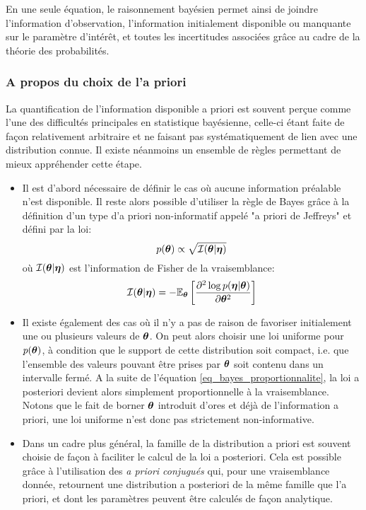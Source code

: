 	En une seule équation, le raisonnement bayésien permet ainsi de joindre l'information d'observation, l'information initialement disponible ou manquante sur le paramètre d'intérêt, et toutes les incertitudes associées grâce au cadre de la théorie des probabilités.
	
	\subsubsection{A propos du choix de l'a priori}
	
	La quantification de l'information disponible a priori est souvent perçue comme l'une des difficultés principales en statistique bayésienne, celle-ci étant faite de façon relativement arbitraire et ne faisant pas systématiquement de lien avec une distribution connue. Il existe néanmoins un ensemble de règles permettant de mieux appréhender cette étape.
	
	\begin{itemize}
		\item Il est d'abord nécessaire de définir le cas où aucune information préalable n'est disponible. Il reste alors possible d'utiliser la règle de Bayes grâce à la définition d'un type d'a priori non-informatif appelé "a priori de Jeffreys" et défini par la loi:\\
		\begin{equation}
		p({\bm{\theta}}) \propto \sqrt{\mathcal{I}({\bm{\theta}} | {\bm{\eta}})}
		\label{eq_jeffreys}
		\end{equation}
		où $\mathcal{I}({\bm{\theta}} | {\bm{\eta}})$ est l'information de Fisher de la vraisemblance:
		\begin{equation}
		\mathcal{I}({\bm{\theta}} | {\bm{\eta}}) = -\mathbb{E}_{\bm{\theta}}\left[\dfrac{\partial^2 \log p({\bm{\eta}}|{\bm{\theta}})}{\partial {\bm{\theta}}^2}\right]
		\end{equation}
		
		\item Il existe également des cas où il n'y a pas de raison de favoriser initialement une ou plusieurs valeurs de ${\bm{\theta}}$. On peut alors choisir une loi uniforme pour $p({\bm{\theta}})$, à condition que le support de cette distribution soit compact, i.e. que l'ensemble des valeurs pouvant être prises par ${\bm{\theta}}$ soit contenu dans un intervalle fermé. A la suite de l'équation \eqref{eq_bayes_proportionnalite}, la loi a posteriori devient alors simplement proportionnelle à la vraisemblance. Notons que le fait de borner ${\bm{\theta}}$ introduit d'ores et déjà de l'information a priori, une loi uniforme n'est donc pas strictement non-informative.\\
		
		\item Dans un cadre plus général, la famille de la distribution a priori est souvent choisie de façon à faciliter le calcul de la loi a posteriori. Cela est possible grâce à l'utilisation des \textit{a priori conjugués} qui, pour une vraisemblance donnée, retournent une distribution a posteriori de la même famille que l'a priori, et dont les paramètres peuvent être calculés de façon analytique.\\
	\end{itemize}
	
